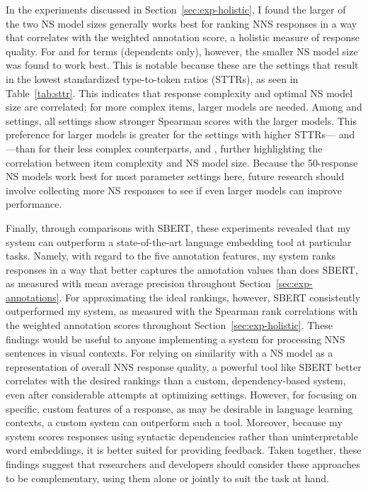 In the experiments discussed in Section~\ref{sec:exp-holistic}, I found the larger of the two NS model sizes generally works best for ranking NNS responses in a way that correlates with the weighted annotation score, a holistic measure of response quality. For  and for  terms (dependents only), however, the smaller NS model size was found to work best. This is notable because these are the settings that result in the lowest standardized type-to-token ratios (STTRs), as seen in Table~\ref{tab:sttr}. This indicates that response complexity and optimal NS model size are correlated; for more complex items, larger models are needed. Among  and  settings, all settings show stronger Spearman scores with the larger models. This preference for larger models is greater for the settings with higher STTRs--- and ---than for their less complex counterparts,  and , further highlighting the correlation between item complexity and NS model size. Because the 50-response NS models work best for most parameter settings here, future research should involve collecting more NS responses to see if even larger models can improve performance.

Finally, through comparisons with SBERT, these experiments revealed that my system can outperform a state-of-the-art language embedding tool at particular tasks. Namely, with regard to the five annotation features, my system ranks responses in a way that better captures the annotation values than does SBERT, as measured with mean average precision throughout Section~\ref{sec:exp-annotations}. For approximating the ideal rankings, however, SBERT consistently outperformed my system, as measured with the Spearman rank correlations with the weighted annotation scores throughout Section~\ref{sec:exp-holistic}. These findings would be useful to anyone implementing a system for processing NNS sentences in visual contexts. For relying on similarity with a NS model as a representation of overall NNS response quality, a powerful tool like SBERT better correlates with the desired rankings than a custom, dependency-based system, even after considerable attempts at optimizing settings. However, for focusing on specific, custom features of a response, as may be desirable in language learning contexts, a custom system can outperform such a tool. Moreover, because my system scores responses using syntactic dependencies rather than uninterpretable word embeddings, it is better suited for providing feedback. Taken together, these findings suggest that researchers and developers should consider these approaches to be complementary, using them alone or jointly to suit the task at hand. 


